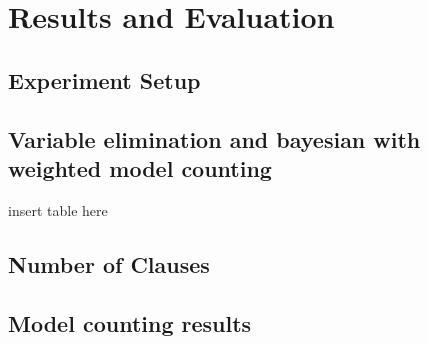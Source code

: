 \section{Results and Evaluation}
\subsection{Experiment Setup}

\subsection{Variable elimination and bayesian with weighted model counting}
insert table here

\subsection{Number of Clauses}


\subsection{Model counting results}
